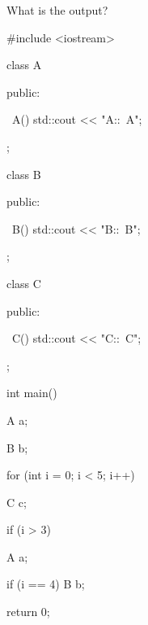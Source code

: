 What is the output?



\begin{consolethree}[escapeinside=||]

#include <iostream>



class A

{

public:

    ~A() { std::cout << "A::~A\n"; }

};



class B

{

public:

    ~B() { std::cout << "B::~B\n"; }

};



class C

{

public:

    ~C() { std::cout << "C::~C\n"; }

};



int main()

{

    A a;

    B b;

    for (int i = 0; i < 5; i++)

    {

        C c;

        if (i > 3)

        {

            A a;

            if (i == 4) B b;

        }

    }

    return 0;

}

\end{consolethree}

